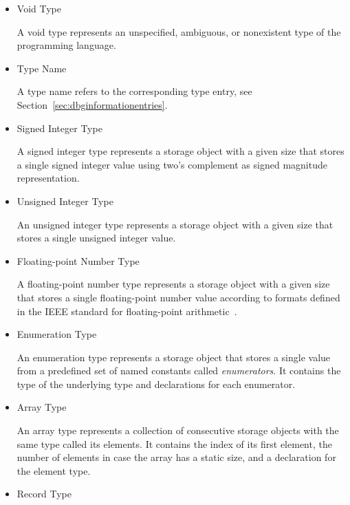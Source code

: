 \begin{itemize}

\item Void Type\alignright{}\nopagebreak

A void type represents an unspecified, ambiguous, or nonexistent type of the programming language.

\item Type Name\alignright{}\nopagebreak

A type name refers to the corresponding type entry, see Section~\ref{sec:dbginformationentries}.

\item Signed Integer Type\alignright{}\nopagebreak

A signed integer type represents a storage object with a given size that stores a single signed integer value using two's complement as signed magnitude representation.

\item Unsigned Integer Type\alignright{}\nopagebreak

An unsigned integer type represents a storage object with a given size that stores a single unsigned integer value.

\item Floating-point Number Type\alignright{}\nopagebreak

A floating-point number type represents a storage object with a given size that stores a single floating-point number value according to formats defined in the IEEE standard for floating-point arithmetic~\cite{ieee1985}.

\item Enumeration Type\alignright{}\nopagebreak

An enumeration type represents a storage object that stores a single value from a predefined set of named constants called \emph{enumerators}.
It contains the type of the underlying type and declarations for each enumerator.

\item Array Type\alignright{}\nopagebreak

An array type represents a collection of consecutive storage objects with the same type called its elements.
It contains the index of its first element, the number of elements in case the array has a static size, and a declaration for the element type.

\item Record Type\alignright{}\nopagebreak


\end{itemize}
